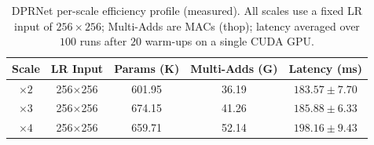 \begin{table}[H]
\centering
\caption{DPRNet per-scale efficiency profile (measured). All scales use a fixed LR input of
$256\times256$; Multi-Adds are MACs (thop); latency averaged over $100$ runs after $20$ warm-ups on a
single CUDA GPU.}
\label{tab:efficiency_profile}
\begingroup
\scriptsize
\setlength{\tabcolsep}{3pt}
\renewcommand{\arraystretch}{1.05}
\begin{tabular*}{\columnwidth}{@{\extracolsep{\fill}}ccccc}
\toprule
Scale & LR Input & Params (K) & Multi-Adds (G) & Latency (ms) \\
\midrule
$\times 2$ & 256$\times$256 & 601.95 & 36.19 & $183.57\pm7.70$ \\
$\times 3$ & 256$\times$256 & 674.15 & 41.26 & $185.88\pm6.33$ \\
$\times 4$ & 256$\times$256 & 659.71 & 52.14 & $198.16\pm9.43$ \\
\bottomrule
\end{tabular*}
\endgroup
\end{table}
